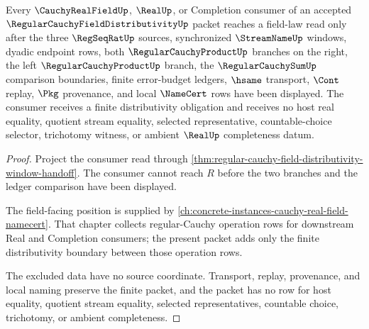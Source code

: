 \begin{theorem}
\label{thm:regular-cauchy-field-distributivity-real-seal-boundary}
Every $\CauchyRealFieldUp$, $\RealUp$, or Completion consumer of an accepted $\RegularCauchyFieldDistributivityUp$ packet reaches a field-law read only after the three $\RegSeqRatUp$ sources, synchronized $\StreamNameUp$ windows, dyadic endpoint rows, both $\RegularCauchyProductUp$ branches on the right, the left $\RegularCauchyProductUp$ branch, the $\RegularCauchySumUp$ comparison boundaries, finite error-budget ledgers, $\hsame$ transport, $\Cont$ replay, $\Pkg$ provenance, and local $\NameCert$ rows have been displayed. The consumer receives a finite distributivity obligation and receives no host real equality, quotient stream equality, selected representative, countable-choice selector, trichotomy witness, or ambient $\RealUp$ completeness datum.
\end{theorem}
\begin{proof}
Project the consumer read through \autoref{thm:regular-cauchy-field-distributivity-window-handoff}. The consumer cannot reach $R$ before the two branches and the ledger comparison have been displayed.

The field-facing position is supplied by \autoref{ch:concrete-instances-cauchy-real-field-namecert}. That chapter collects regular-Cauchy operation rows for downstream Real and Completion consumers; the present packet adds only the finite distributivity boundary between those operation rows.

The excluded data have no source coordinate. Transport, replay, provenance, and local naming preserve the finite packet, and the packet has no row for host equality, quotient stream equality, selected representatives, countable choice, trichotomy, or ambient completeness.
\end{proof}

